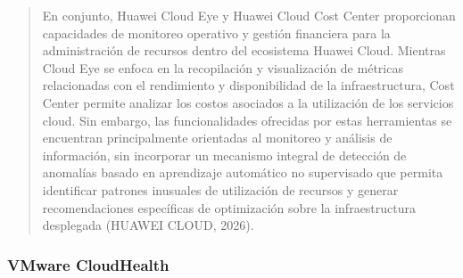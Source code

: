 \documentclass[
]{article}
\begin{document}
\begin{quote}
En conjunto, Huawei Cloud Eye y Huawei Cloud Cost Center proporcionan
capacidades de monitoreo operativo y gestión financiera para la
administración de recursos dentro del ecosistema Huawei Cloud. Mientras
Cloud Eye se enfoca en la recopilación y visualización de métricas
relacionadas con el rendimiento y disponibilidad de la infraestructura,
Cost Center permite analizar los costos asociados a la utilización de
los servicios cloud. Sin embargo, las funcionalidades ofrecidas por
estas herramientas se encuentran principalmente orientadas al monitoreo
y análisis de información, sin incorporar un mecanismo integral de
detección de anomalías basado en aprendizaje automático no supervisado
que permita identificar patrones inusuales de utilización de recursos y
generar recomendaciones específicas de optimización sobre la
infraestructura desplegada (HUAWEI CLOUD, 2026).
\end{quote}

\subsubsection{VMware CloudHealth}\label{vmware-cloudhealth}
\end{document}
